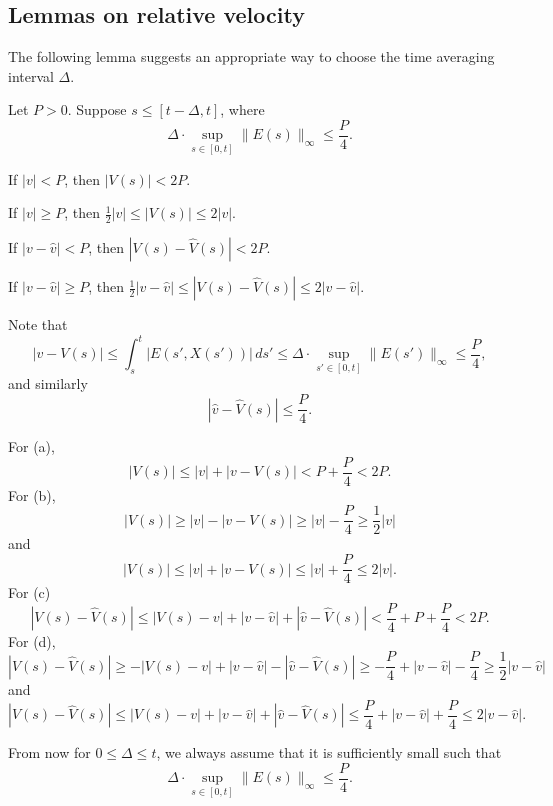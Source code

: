 \documentclass[12pt]{article}
\begin{document}
\subsection{Lemmas on relative velocity}
The following lemma suggests an appropriate way to choose the time averaging interval $\Delta$.
\begin{lem}
Let $P>0$.
Suppose $s\le[t-\Delta,t]$, where
\[\Delta\cdot\sup_{s\in[0,t]}\|E(s)\|_\infty\le\frac P4.\]
\begin{parts}
\item If $|v|<P$, then $|V(s)|<2P$.
\item If $|v|\ge P$, then $\frac12|v|\le|V(s)|\le2|v|$. 
\item If $|v-\hat v|<P$, then $|V(s)-\hat V(s)|<2P$.
\item If $|v-\hat v|\ge P$, then $\frac12|v-\hat v|\le|V(s)-\hat V(s)|\le2|v-\hat v|$.
\end{parts}
\end{lem}
\begin{pf}
Note that
\[|v-V(s)|\le\int_s^t|E(s',X(s'))|\,ds'\le\Delta\cdot\sup_{s'\in[0,t]}\|E(s')\|_\infty\le\frac P4,\]
and similarly
\[|\hat v-\hat V(s)|\le\frac P4.\]

For (a),
\[|V(s)|\le|v|+|v-V(s)|<P+\frac P4<2P.\]
For (b),
\[|V(s)|\ge|v|-|v-V(s)|\ge|v|-\frac P4\ge\frac12|v|\]
and
\[|V(s)|\le|v|+|v-V(s)|\le|v|+\frac P4\le2|v|.\]
For (c)
\[|V(s)-\hat V(s)|\le|V(s)-v|+|v-\hat v|+|\hat v-\hat V(s)|<\frac P4+P+\frac P4<2P.\]
For (d),
\[|V(s)-\hat V(s)|\ge-|V(s)-v|+|v-\hat v|-|\hat v-\hat V(s)|\ge-\frac P4+|v-\hat v|-\frac P4\ge\frac12|v-\hat v|\]
and
\[|V(s)-\hat V(s)|\le|V(s)-v|+|v-\hat v|+|\hat v-\hat V(s)|\le\frac P4+|v-\hat v|+\frac P4\le2|v-\hat v|.\]
\end{pf}


From now for $0\le\Delta\le t$, we always assume that it is sufficiently small such that
\[\Delta\cdot\sup_{s\in[0,t]}\|E(s)\|_\infty\le\frac P4.\]
\end{document}
